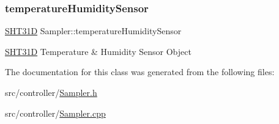 \mbox{\label{classSampler_aad073931f59004109e8050c669b294c0}} 
\subsubsection{\texorpdfstring{temperature\+Humidity\+Sensor}{temperatureHumiditySensor}}
{\footnotesize\ttfamily \hyperlink{classSHT31D}{S\+H\+T31D} Sampler\+::temperature\+Humidity\+Sensor\hspace{0.3cm}{\ttfamily [private]}}

\hyperlink{classSHT31D}{S\+H\+T31D} Temperature \& Humidity Sensor Object 

The documentation for this class was generated from the following files\+:\begin{DoxyCompactItemize}
\item 
src/controller/\hyperlink{Sampler_8h}{Sampler.\+h}\item 
src/controller/\hyperlink{Sampler_8cpp}{Sampler.\+cpp}\end{DoxyCompactItemize}
